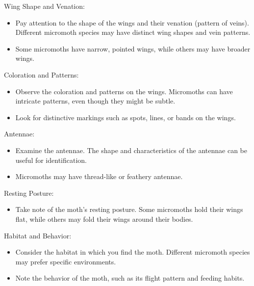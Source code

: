 \documentclass[
  ignorenonframetext,
]{beamer}
\providecommand{\tightlist}{%
  \setlength{\itemsep}{0pt}\setlength{\parskip}{0pt}}
\begin{document}
\begin{frame}{Wing Shape and Venation:}
\protect\hypertarget{wing-shape-and-venation}{}
\begin{itemize}
\tightlist
\item
  Pay attention to the shape of the wings and their venation (pattern of
  veins). Different micromoth species may have distinct wing shapes and
  vein patterns.
\item
  Some micromoths have narrow, pointed wings, while others may have
  broader wings.
\end{itemize}
\end{frame}

\begin{frame}{Coloration and Patterns:}
\protect\hypertarget{coloration-and-patterns}{}
\begin{itemize}
\tightlist
\item
  Observe the coloration and patterns on the wings. Micromoths can have
  intricate patterns, even though they might be subtle.
\item
  Look for distinctive markings such as spots, lines, or bands on the
  wings.
\end{itemize}
\end{frame}

\begin{frame}{Antennae:}
\protect\hypertarget{antennae}{}
\begin{itemize}
\tightlist
\item
  Examine the antennae. The shape and characteristics of the antennae
  can be useful for identification.
\item
  Micromoths may have thread-like or feathery antennae.
\end{itemize}
\end{frame}

\begin{frame}{Resting Posture:}
\protect\hypertarget{resting-posture}{}
\begin{itemize}
\tightlist
\item
  Take note of the moth's resting posture. Some micromoths hold their
  wings flat, while others may fold their wings around their bodies.
\end{itemize}
\end{frame}

\begin{frame}{Habitat and Behavior:}
\protect\hypertarget{habitat-and-behavior}{}
\begin{itemize}
\tightlist
\item
  Consider the habitat in which you find the moth. Different micromoth
  species may prefer specific environments.
\item
  Note the behavior of the moth, such as its flight pattern and feeding
  habits.
\end{itemize}
\end{frame}
\end{document}
